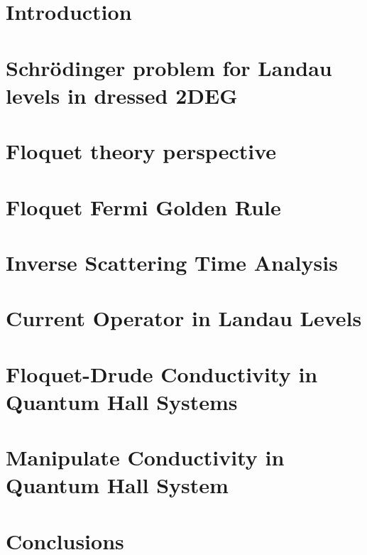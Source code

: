 \documentclass[%
 reprint,
 amsmath,amssymb,
 aps,
prb,
]{revtex4-2}
\begin{document}
\section{\label{sec:introduction} Introduction}


\section{Schrödinger problem for Landau levels in dressed 2DEG
}


\section{Floquet theory perspective}


\section{Floquet Fermi Golden Rule}


\section{Inverse Scattering Time Analysis}


\section{Current Operator in Landau Levels}


\section{Floquet-Drude Conductivity in Quantum Hall Systems}


\section{Manipulate Conductivity in Quantum Hall System}


\section{Conclusions}

\end{document}
